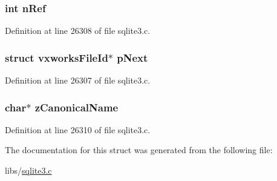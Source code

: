 \subsubsection[{n\+Ref}]{\setlength{\rightskip}{0pt plus 5cm}int n\+Ref}\label{structvxworks_file_id_a3c459f9ae278c22b72583c55ca01acb7}


Definition at line 26308 of file sqlite3.\+c.

\hypertarget{structvxworks_file_id_aa7116bf768457ee02c7488fc6c98baa5}{}
\subsubsection[{p\+Next}]{\setlength{\rightskip}{0pt plus 5cm}struct {\bf vxworks\+File\+Id}$\ast$ p\+Next}\label{structvxworks_file_id_aa7116bf768457ee02c7488fc6c98baa5}


Definition at line 26307 of file sqlite3.\+c.

\hypertarget{structvxworks_file_id_a924e630d35893bcc88da1c2e913bddf9}{}
\subsubsection[{z\+Canonical\+Name}]{\setlength{\rightskip}{0pt plus 5cm}char$\ast$ z\+Canonical\+Name}\label{structvxworks_file_id_a924e630d35893bcc88da1c2e913bddf9}


Definition at line 26310 of file sqlite3.\+c.



The documentation for this struct was generated from the following file\+:\begin{DoxyCompactItemize}
\item 
libs/\hyperlink{sqlite3_8c}{sqlite3.\+c}\end{DoxyCompactItemize}

